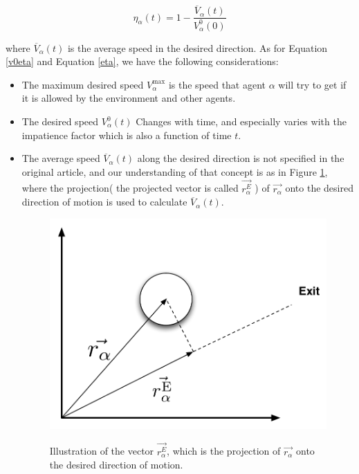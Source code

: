 \begin{equation}\label{eta}
	\eta_{\alpha} \left( t \right) =
    1 - \frac{\overline{V}_{\alpha} \left( t \right)}
             {V_{\alpha}^{0} \left( 0 \right)}
\end{equation}

where $\overline{V}_{\alpha}\left( t \right)$ is the average speed in the desired direction.
As for Equation \ref{v0eta} and Equation \ref{eta}, we have the following considerations:

\begin{itemize}
\item The maximum desired speed $V_{\alpha}^{\text{max}}$ is the speed that agent $\alpha$ will try 
to get if it is allowed by the environment and other agents. 

\item The desired speed $V_{\alpha}^{0} \left( t \right)$ Changes with time, and especially varies 
with the impatience factor which is also a function of time $ t $.

\item The average speed $\overline{V}_{\alpha} \left( t \right)$ along the desired direction is not specified 
in the original article, and our understanding of that concept is as in Figure \ref{impatience}, where the 
projection( the projected vector is called $ \vec{r_{\alpha}^{E}}$ ) of $ \vec{r_{\alpha}} $ onto the desired 
direction of motion is used to calculate $\overline{V}_{\alpha} \left( t \right)$.

\begin{figure}[ht]
\centering
{\includegraphics[scale=0.35]{Figures/NotationOfAgent2.pdf}} 
\caption{Illustration of the vector $ \vec{r_{\alpha}^{E}}$, which is the projection of $ \vec{r_{\alpha}} $ onto the desired direction of motion.}
\label{impatience}
\end{figure}


\end{itemize}

